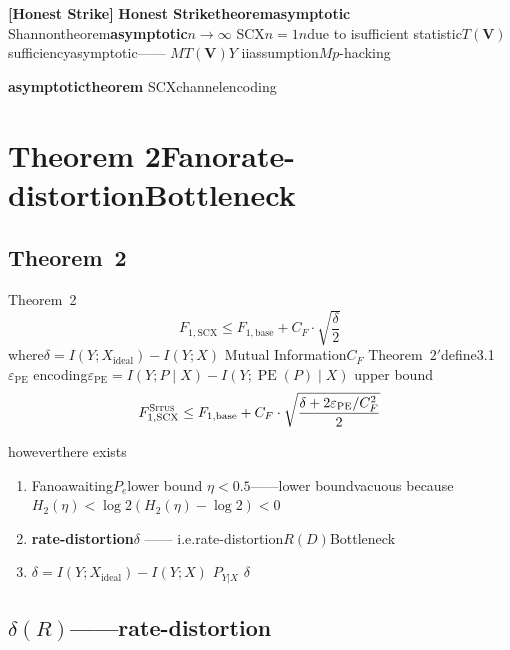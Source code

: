 \documentclass[11pt,a4paper]{article}
\theoremstyle{remark}
\DeclareMathOperator{\PE}{PE}
\newcommand{\Situs}{\textsc{Situs}}
\newcommand{\honeststrike}{\textnormal{\textbf{[Honest Strike]}}}
\begin{document}
\honeststrike{} \textbf{Honest Striketheoremasymptotic}
Shannontheorem\textbf{asymptotic}$n \to \infty$
SCX$n=1$$n$due to
isufficient statistic$T(\mathbf{V})$sufficiencyasymptotic——
$M$$T(\mathbf{V})$$Y$
iiassumption$M$$p$-hacking

\textbf{asymptotictheorem}\cite{polyanskiy2010}
SCXchannelencoding

\section{Theorem 2Fanorate-distortionBottleneck}

\subsection{Theorem~2}

Theorem~2\cite{scx2026theorems}
\begin{equation}
    F_{1,\text{SCX}} \leq F_{1,\text{base}} + C_F \cdot \sqrt{\frac{\delta}{2}}
\end{equation}
where$\delta = I(Y; X_{\text{ideal}}) - I(Y; X)$\textbf{}
Mutual Information$C_F$
Theorem~$2'$define3.1$\varepsilon_{\PE}$
encoding$\varepsilon_{\PE} = I(Y; P \mid X) - I(Y; \PE(P) \mid X)$
upper bound
\begin{equation}
    F_{1,\text{SCX}}^{\Situs} \leq F_{1,\text{base}}
    + C_F \cdot \sqrt{\frac{\delta + 2\varepsilon_{\PE}/C_F^2}{2}}
\end{equation}

howeverthere exists
\begin{enumerate}[label=(\arabic*)]
    \item \textbf{}Fanoawaiting$P_e$lower bound
          $\eta < 0.5$\textbf{}——lower boundvacuous
          because$H_2(\eta) < \log 2$$(H_2(\eta) - \log 2) < 0$
    \item \textbf{rate-distortion}$\delta$\textbf{}
          \textbf{}——
          i.e.rate-distortion$R(D)$Bottleneck
    \item \textbf{}$\delta = I(Y; X_{\text{ideal}}) - I(Y; X)$
          $P_{Y|X}$\textbf{}
          $\delta$
\end{enumerate}

\subsection{$\delta(R)$——rate-distortion}
\end{document}
